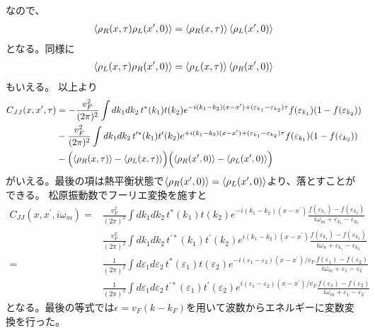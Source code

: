 \documentclass[10pt,a4j]{jarticle}
\begin{document}
なので、
\begin{align}
\braket{\rho_{R}(x,\tau) \rho_{L}(x^\prime,0)}  = \braket{\rho_{R}(x,\tau)}  \braket{ \rho_{L}(x^\prime,0)}
\end{align}
となる。同様に
\begin{align}
\braket{\rho_{L}(x,\tau) \rho_{R}(x^\prime,0)}  = \braket{\rho_{L}(x,\tau)}  \braket{ \rho_{R}(x^\prime,0)}
\end{align}
もいえる。
以上より
\begin{align}
C_{JJ}(x,x^\prime,\tau) &= - \frac{v_F^2}{(2\pi)^2} \int dk_1 dk_2\,
t^{*} (k_1)t(k_2)e^{-i(k_1-k_2)(x-x^\prime) + (\varepsilon_{k_1} - \varepsilon_{k_2})\tau}f(\varepsilon_{k_1})(1 - f(\varepsilon_{k_2})) \nonumber \\
&- \frac{v_F^2}{(2\pi)^2} \int dk_1 dk_2\,
t^{\prime*} (k_1)t^\prime(k_2)e^{+i(k_1-k_2)(x-x^\prime) + (\varepsilon_{k_1} - \varepsilon_{k_2})\tau}f(\varepsilon_{k_1})(1 - f(\varepsilon_{k_2})) \nonumber \\
& -\Bigl(\braket{\rho_{R}(x,\tau)} - \braket{ \rho_{L}(x,\tau)}\Bigr)\Bigl(\braket{\rho_{R}(x^\prime,0)} - \braket{ \rho_{L}(x^\prime,0)}\Bigr)
\end{align}
がいえる。最後の項は熱平衡状態で$\braket{\rho_{R}(x^\prime,0)} = \braket{ \rho_{L}(x^\prime,0)}$より、落とすことができる。
松原振動数でフーリエ変換を施すと
\begin{align}
C_{JJ}(x,x^\prime,i \omega_m) =& \frac{v_F^2}{(2\pi)^2} \int dk_1 dk_2\,
t^{*} (k_1)t(k_2)e^{-i(k_1-k_2)(x-x^\prime)} 
\frac{f(\varepsilon_{k_1}) - f(\varepsilon_{k_2})}{i\omega_m + \varepsilon_{k_1}-\varepsilon_{k_2} } \nonumber \\
&  \frac{v_F^2}{(2\pi)^2} \int dk_1 dk_2\,
t^{\prime*}(k_1)t^\prime(k_2)e^{i(k_1-k_2)(x-x^\prime)} 
\frac{f(\varepsilon_{k_1}) - f(\varepsilon_{k_2})}{i\omega_n + \varepsilon_{k_1}-\varepsilon_{k_2} } \nonumber \\
= &\frac{1}{(2\pi)^2} 
\int d\varepsilon_1 d\varepsilon_2 \, 
t^{*} (\varepsilon_1)t(\varepsilon_2)e^{-i(\varepsilon_1-\varepsilon_2)(x-x^\prime)/v_F} \frac{f(\varepsilon_1) - f(\varepsilon_2)}{i\omega_m + \varepsilon_1-\varepsilon_2 } \nonumber \\
& \frac{1}{(2\pi)^2} 
\int d\varepsilon_1 d\varepsilon_2 \,
t^{\prime*} (\varepsilon_1)t^\prime(\varepsilon_2)
e^{i(\varepsilon_1-\varepsilon_2)(x-x^\prime)/v_F} \frac{f(\varepsilon_1) - f(\varepsilon_2)}{i\omega_m + \varepsilon_1-\varepsilon_2 } 
\end{align}
となる。最後の等式では$\epsilon = v_F(k-k_F)$を用いて波数からエネルギーに変数変換を行った。
\end{document}

